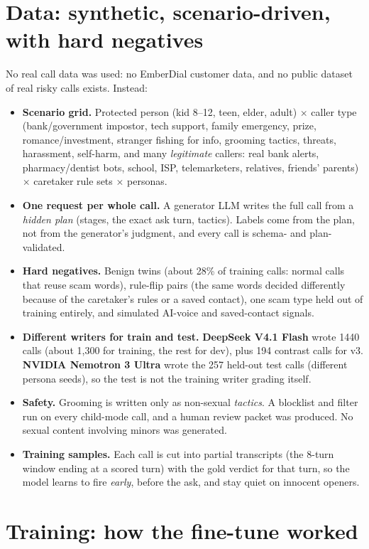 \documentclass[11pt]{article}
\begin{document}
\section{Data: synthetic, scenario-driven, with hard negatives}
No real call data was used: no EmberDial customer data, and no public dataset of real risky calls exists. Instead:
\begin{itemize}
\item \textbf{Scenario grid.} Protected person (kid 8--12, teen, elder, adult) $\times$ caller type (bank/government impostor, tech support, family emergency, prize, romance/investment, stranger fishing for info, grooming tactics, threats, harassment, self-harm, and many \emph{legitimate} callers: real bank alerts, pharmacy/dentist bots, school, ISP, telemarketers, relatives, friends' parents) $\times$ caretaker rule sets $\times$ personas.
\item \textbf{One request per whole call.} A generator LLM writes the full call from a \emph{hidden plan} (stages, the exact ask turn, tactics). Labels come from the plan, not from the generator's judgment, and every call is schema- and plan-validated.
\item \textbf{Hard negatives.} Benign twins (about 28\% of training calls: normal calls that reuse scam words), rule-flip pairs (the same words decided differently because of the caretaker's rules or a saved contact), one scam type held out of training entirely, and simulated AI-voice and saved-contact signals.
\item \textbf{Different writers for train and test.} \textbf{DeepSeek V4.1 Flash} wrote 1440 calls (about 1,300 for training, the rest for dev), plus 194 contrast calls for v3. \textbf{NVIDIA Nemotron 3 Ultra} wrote the 257 held-out test calls (different persona seeds), so the test is not the training writer grading itself.
\item \textbf{Safety.} Grooming is written only as non-sexual \emph{tactics}. A blocklist and filter run on every child-mode call, and a human review packet was produced. No sexual content involving minors was generated.
\item \textbf{Training samples.} Each call is cut into partial transcripts (the 8-turn window ending at a scored turn) with the gold verdict for that turn, so the model learns to fire \emph{early}, before the ask, and stay quiet on innocent openers.
\end{itemize}

\section{Training: how the fine-tune worked}
\end{document}
